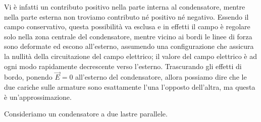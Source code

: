 \begin{figure}[htpb]
\end{figure}
\FloatBarrier

Vi è infatti un contributo positivo nella parte interna al condensatore, mentre nella parte esterna non troviamo contributo né positivo né negativo. Essendo il campo conservativo, questa possibilità va esclusa e in effetti il campo è regolare solo nella zona centrale del condensatore, mentre vicino ai bordi le linee di forza sono deformate ed escono all'esterno, assumendo una configurazione che assicura la nullità della circuitazione del campo elettrico; il valore del campo elettrico è ad ogni modo rapidamente decrescente verso l'esterno.
Trascurando gli effetti di bordo, ponendo $ \vec{E} =0 $ all'esterno del condensatore, allora possiamo dire che le due cariche sulle armature sono esattamente l'una l'opposto dell'altra, ma questa è un'approssimazione.

Consideriamo un condensatore a due lastre parallele.

